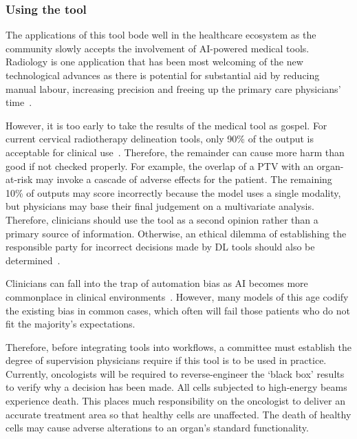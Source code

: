 \documentclass[11pt,twoside]{report}
\begin{document}
\subsubsection{Using the tool}

The applications of this tool bode well in the healthcare ecosystem as the community slowly accepts the involvement of AI-powered medical tools. Radiology is one application that has been most welcoming of the new technological advances as there is potential for substantial aid by reducing manual labour, increasing precision and freeing up the primary care physicians' time~\cite{Amisha2019-ki}.

However, it is too early to take the results of the medical tool as gospel. For current cervical radiotherapy delineation tools, only 90\% of the output is acceptable for clinical use~\cite{LIU2020172}. Therefore, the remainder can cause more harm than good if not checked properly. For example, the overlap of a PTV with an organ-at-risk may invoke a cascade of adverse effects for the patient. The remaining 10\% of outputs may score incorrectly because the model uses a single modality, but physicians may base their final judgement on a multivariate analysis. Therefore, clinicians should use the tool as a second opinion rather than a primary source of information. Otherwise, an ethical dilemma of establishing the responsible party for incorrect decisions made by DL tools should also be determined~\cite{Chen2021-dg}.

Clinicians can fall into the trap of automation bias as AI becomes more commonplace in clinical environments~\cite{STRAW2020101965}. However, many models of this age codify the existing bias in common cases, which often will fail those patients who do not fit the majority's expectations. 

Therefore, before integrating tools into workflows, a committee must establish the degree of supervision physicians require if this tool is to be used in practice. Currently, oncologists will be required to reverse-engineer the `black box' results to verify why a decision has been made. All cells subjected to high-energy beams experience death. This places much responsibility on the oncologist to deliver an accurate treatment area so that healthy cells are unaffected. The death of healthy cells may cause adverse alterations to an organ's standard functionality.



\end{document}
